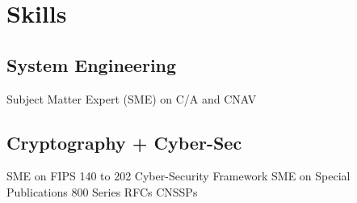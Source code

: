 \documentclass[letterpaper]{deedy-resume} %
\begin{document}
\begin{minipage}[t]{0.33\textwidth}

\section{Skills}

\subsection{System Engineering}

Subject Matter Expert (SME) on C/A and CNAV
\sectionspace %
\subsection{Cryptography + Cyber-Sec}
SME on FIPS 140 to 202\textbullet{} Cyber-Security Framework \textbullet{} SME on Special Publications 800 Series \textbullet{} RFCs \textbullet{} CNSSPs \\

\sectionspace %


\end{minipage} %
\hfill
%
%
\end{document}
